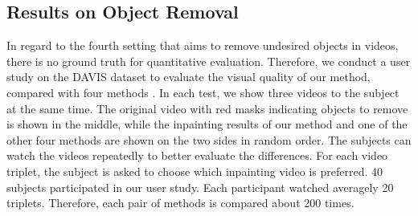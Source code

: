 \subsection{Results on Object Removal}


In regard to the fourth setting that aims to remove undesired objects in videos, there is no ground truth for quantitative evaluation. Therefore,
we conduct a user study on the DAVIS dataset to evaluate the visual quality of our method, compared with four methods \cite{nazeri2019edgeconnect,wang2019video,Kim_2019_CVPR1,Xu_2019_CVPR}.
%
In each test, we show three videos to the subject at the same time. The original video with red masks indicating objects to remove is shown in the middle, while the inpainting results of our method and one of the other four methods are shown on the two sides in random order.
%  
The subjects can watch the videos repeatedly to better evaluate the differences.
For each video triplet, the subject is asked to choose which inpainting video is preferred.
40 subjects participated in our user study. 
Each participant watched averagely 20 triplets. 
Therefore, each pair of methods is compared about 200 times.

%



